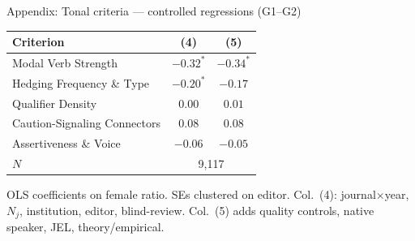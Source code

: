 \documentclass[aspectratio=169,11pt]{beamer}
\begin{document}
\begin{frame}{Appendix: Tonal criteria — controlled regressions (G1--G2)}
    \vfill
    \begin{center}
    {\small
    \begin{tabular}{lcc}
        \toprule
        Criterion & (4) & (5) \\
        \midrule
        Modal Verb Strength               & $-0.32^{*}$  & $-0.34^{*}$  \\
        Hedging Frequency \& Type         & $-0.20^{*}$  & $-0.17$      \\
        Qualifier Density                 & $0.00$       & $0.01$       \\
        Caution-Signaling Connectors      & $0.08$       & $0.08$       \\
        Assertiveness \& Voice            & $-0.06$      & $-0.05$      \\
        \midrule
        $N$                               & \multicolumn{2}{c}{9,117} \\
        \bottomrule
    \end{tabular}
    }
    \end{center}
    \vspace{0.2cm}
    \begin{center}
        {\small\color{WarmGray}
        OLS coefficients on female ratio. SEs clustered on editor.
        Col.~(4): journal$\times$year, $N_j$, institution, editor, blind-review.
        Col.~(5) adds quality controls, native speaker, JEL, theory/empirical.}
    \end{center}
    \vfill
\end{frame}
\end{document}
